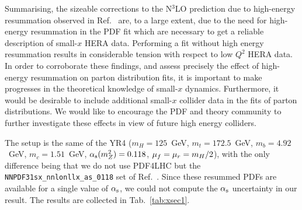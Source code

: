 Summarising, the sizeable corrections to the N$^3$LO prediction due to
high-energy resummation observed in Ref.~\cite{Bonvini:2018ixe} are,
to a large extent, due to the need for high-energy resummation in the
PDF fit which are necessary to get a reliable description of small-$x$
HERA data.  Performing a fit without high energy resummation results
in considerable tension with respect to low $Q^2$ HERA data.  In order
to corroborate these findings, and assess precisely the effect of
high-energy resummation on parton distribution fits, it is important
to make progresses in the theoretical knowledge of small-$x$
dynamics. Furthermore, it would be desirable to include additional
small-$x$ collider data in the fits of parton distributions.  We would
like to encourage the PDF and theory community to further investigate
these effects in view of future high energy colliders.




The setup is the same of the YR4 ($m_H=125$~GeV, $m_t=172.5$~GeV,
$m_b=4.92$~GeV, $m_c=1.51$~GeV, $\alpha_\text{s}(m_Z^2)=0.118$,
$\mu_f=\mu_r=m_H/2$), with the only difference being that we do not use
PDF4LHC but the 
\verb+NNPDF31sx_nnlonllx_as_0118+ set of
Ref.~\cite{Ball:2017otu}.  Since these resummed PDFs are available for
a single value of $\alpha_\text{s}$, we could not compute the $\alpha_\text{s}$ uncertainty in
our result. The results are collected in Tab.~\ref{tab:xsec1}.

